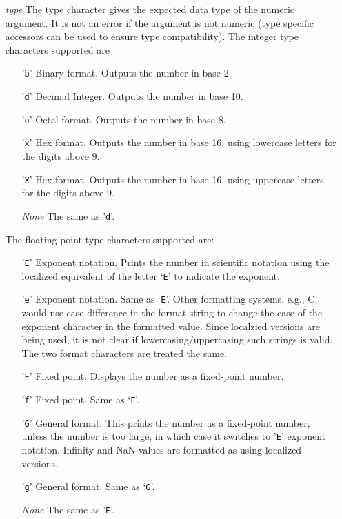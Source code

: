 \begin{itemize}
\item[\textit{type}]
    The type character gives the expected data type of the numeric argument.
    It is not an error if the argument is not numeric (type specific accessors
    can be used to ensure type compatibility).  The integer type characters
    supported are
    \begin{itemize}
    \item['\texttt{b}']
        Binary format. Outputs the number in base 2.
    \item['\texttt{d}']
        Decimal Integer. Outputs the number in base 10.
    \item['\texttt{o}']
        Octal format. Outputs the number in base 8.
    \item['\texttt{x}']
        Hex format. Outputs the number in base 16, using lowercase letters for
        the digits above 9.
    \item['\texttt{X}']
        Hex format. Outputs the number in base 16, using uppercase letters for
        the digits above 9.
    \item[\textit{None}]
        The same as '\texttt{d}'.
    \end{itemize}

    The floating point type characters supported are:
    \begin{enumerate}
    \item['\texttt{E}']
        Exponent notation. Prints the number in scientific notation using the
        localized equivalent of the letter `\texttt{E}' to indicate the
        exponent.
    \item['\texttt{e}']
        Exponent notation. Same as `\texttt{E}'.  Other formatting systems,
        e.g., C, would use case difference in the format string to change the
        case of the exponent character in the formatted value.  Since localzied
        versions are being used, it is not clear if lowercasing/uppercasing
        such strings is valid.  The two format characters are treated the
        same.
    \item['\texttt{F}']
        Fixed point. Displays the number as a fixed-point number.
    \item['\texttt{f}']
        Fixed point. Same as `\texttt{F}'.
    \item['\texttt{G}']
        General format. This prints the number as a fixed-point
        number, unless the number is too large, in which case
        it switches to '\texttt{E}' exponent notation. Infinity and NaN
        values are formatted as using localized versions.
    \item['\texttt{g}']
        General format. Same as `\texttt{G}'.
    \item[\textit{None}]
        The same as '\texttt{E}'.
    \end{enumerate}


\end{itemize}
